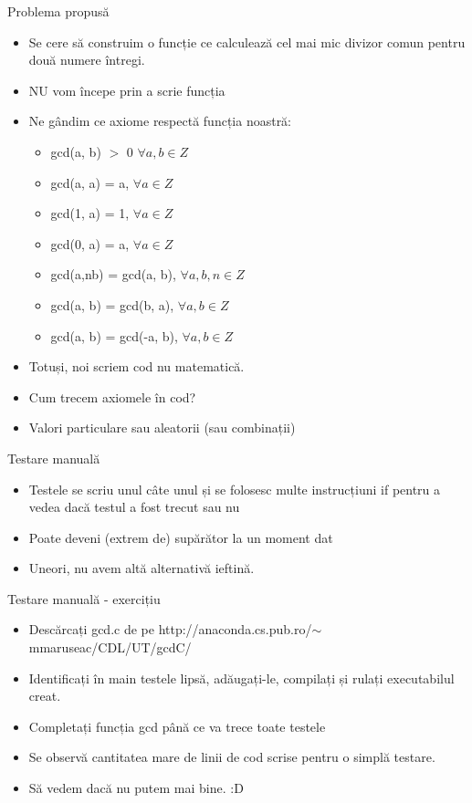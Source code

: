 \documentclass{beamer}
\begin{document}
\begin{frame}{Problema propusă}
\begin{itemize}
\item Se cere să construim o funcție ce calculează cel mai mic divizor comun pentru două numere întregi.
\item \pause NU vom începe prin a scrie funcția
\item \pause Ne gândim ce axiome respectă funcția noastră:
\begin{itemize}
\item \pause gcd(a, b) $>$ 0 $\forall a,b \in Z$
\item gcd(a, a) = a, $\forall a \in Z$
\item gcd(1, a) = 1, $\forall a \in Z$
\item gcd(0, a) = a, $\forall a \in Z$
\item gcd(a,nb) = gcd(a, b), $\forall a,b,n \in Z$
\item gcd(a, b) = gcd(b, a), $\forall a,b \in Z$
\item gcd(a, b) = gcd(-a, b), $\forall a,b \in Z$
\end{itemize}
\item \pause Totuși, noi scriem cod nu matematică.
\item \pause Cum trecem axiomele în cod?
\item \pause Valori particulare sau aleatorii (sau combinații)
\end{itemize}
\end{frame}

\begin{frame}{Testare manuală}
\begin{itemize}
\item Testele se scriu unul câte unul și se folosesc multe instrucțiuni if pentru a vedea dacă testul a fost trecut sau nu
\item \pause Poate deveni (extrem de) supărător la un moment dat
\item \pause Uneori, nu avem altă alternativă ieftină.
\end{itemize}
\end{frame}

\begin{frame}{Testare manuală - exercițiu}
\begin{itemize}
\item Descărcați gcd.c de pe http://anaconda.cs.pub.ro/$\sim$mmaruseac/CDL/UT/gcdC/
\item Identificați în main testele lipsă, adăugați-le, compilați și rulați executabilul creat.
\item \pause Completați funcția gcd până ce va trece toate testele
\item \pause Se observă cantitatea mare de linii de cod scrise pentru o simplă testare.
\item \pause Să vedem dacă nu putem mai bine. :D
\end{itemize}
\end{frame}
\end{document}
